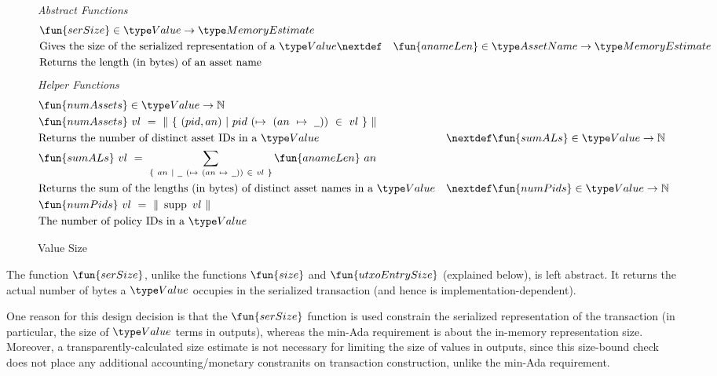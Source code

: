 \begin{figure*}[h]
  \emph{Abstract Functions}
  \begin{align*}
    & \fun{serSize} \in \Value \to \MemoryEstimate \\
    & \text{Gives the size of the serialized representation of a $\Value$}
    \nextdef
    & \fun{anameLen} \in \AssetName \to \MemoryEstimate \\
    & \text{Returns the length (in bytes) of an asset name}
  \end{align*}
  \emph{Helper Functions}
  \begin{align*}
    & \fun{numAssets} \in \Value \to \N \\
    & \fun{numAssets}~{vl}~=~\|~\{~(pid, an)~\vert~pid~(\mapsto~(an~\mapsto~\wcard))~\in~vl~\}~\| \\
    & \text{Returns the number of distinct asset IDs in a $\Value$}
    & \nextdef
    & \fun{sumALs} \in \Value \to \N \\
    & \fun{sumALs}~{vl}~=~ \sum_{\{~an~\vert~\wcard~(\mapsto~(an~\mapsto~\wcard))~\in~vl~\}} \fun{anameLen}~an \\
    & \text{Returns the sum of the lengths (in bytes) of distinct asset names in a $\Value$}
    & \nextdef
    & \fun{numPids} \in \Value \to \N \\
    & \fun{numPids}~{vl} ~=~ \|~\supp~{vl}~\| \\
    & \text{The number of policy IDs in a $\Value$}
  \end{align*}
  \caption{Value Size}
  \label{fig:size-helper}
\end{figure*}

The function $\fun{serSize}$, unlike the functions $\fun{size}$ and $\fun{utxoEntrySize}$
    (explained below), is left abstract. It returns the actual number of bytes a $\Value$
    occupies in the serialized transaction (and hence is implementation-dependent).

    One reason for this design decision is that the $\fun{serSize}$ function is used constrain
    the serialized representation of the transaction (in particular, the size
    of $\Value$ terms in outputs), whereas the min-Ada requirement is about
    the in-memory representation size. Moreover, a transparently-calculated size estimate
    is not necessary for limiting the size of values in outputs, since this size-bound
    check does not place any additional accounting/monetary constranits on transaction construction,
    unlike the min-Ada requirement.

